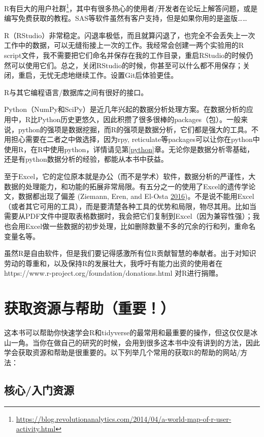 \documentclass[]{book}
\let\rmarkdownfootnote\footnote%
\def\footnote{\protect\rmarkdownfootnote}
\begin{document}
R有巨大的用户社群\footnote{\url{https://blog.revolutionanalytics.com/2014/04/a-world-map-of-r-user-activity.html}}，其中有很多热心的使用者/开发者在论坛上解答问题，或是编写免费获取的教程。SAS等软件虽然有客户支持，但是如果你用的是盗版\ldots{}\ldots{}

R（RStudio）非常稳定。闪退率极低，而且就算闪退了，也完全不会丢失上一次工作中的数据，可以无缝衔接上一次的工作。我经常会创建一两个实验用的R script文件，我不需要把它们命名并保存在我的工作目录，重启RStudio的时候仍然可以使用它们。总之，关闭RStudio的时候，你甚至可以什么都不用保存；关闭，重启，无忧无虑地继续工作。设置Git后体验更佳。

R与其它编程语言/数据库之间有很好的接口。

Python（NumPy和SciPy）是近几年兴起的数据分析处理方案。在数据分析的应用中，R比Python历史更悠久，因此积攒了很多很棒的packages（包）。一般来说，python的强项是数据挖掘，而R的强项是数据分析，它们都是强大的工具。不用担心需要在二者之中做选择，因为rpy, reticulate等packages可以让你在python中使用R，在R中使用python，详情请见第\ref{python}章。无论你是数据分析零基础，还是有python数据分析的经验，都能从本书中获益。

至于Excel，它的定位原本就是办公（而不是学术）软件，数据分析的严谨性，大数据的处理能力，和功能的拓展非常局限。有五分之一的使用了Excel的遗传学论文，数据都出现了偏差 (Ziemann, Eren, and El-Osta \protect\hyperlink{ref-Ziemann2016Gene-name-errors}{2016})。不是说不能用Excel（或者其它可用的工具），而是要清楚各种工具的优势和局限，物尽其用。比如当需要从PDF文件中提取表格数据时，我会把它们复制到Excel（因为兼容性强）；我也会用Excel做一些数据的初步处理，比如删除数量不多的冗余的行和列，重命名变量名等。

虽然R是自由软件，但是我们要记得感激所有位R贡献智慧的奉献者。出于对知识劳动的尊重和，以及保持R的发展壮大，我呼吁有能力出资的使用者在https://www.r-project.org/foundation/donations.html 对R进行捐赠。

\hypertarget{getting-help}{%
\section{获取资源与帮助（重要！）}\label{getting-help}}

这本书可以帮助你快速学会R和tidyverse的最常用和最重要的操作，但这仅仅是冰山一角。当你在做自己的研究的时候，会用到很多这本书中没有讲到的方法，因此学会获取资源和帮助是很重要的。以下列举几个常用的获取R的帮助的网站/方法：

\subsection{核心/入门资源}
\end{document}
